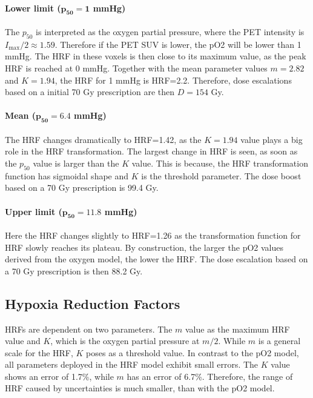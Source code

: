 \paragraph{Lower limit ($\mathbf{p_{50}=1}$ mmHg)}The $p_{50}$ is interpreted as the oxygen partial pressure, where the PET intensity is $I_\mathrm{max}/2\approx 1.59$. Therefore if the PET SUV is lower, the pO2 will be lower than 1 mmHg. The HRF in these voxels is then close to its maximum value, as the peak HRF is reached at 0 mmHg. Together with the mean parameter values $m=2.82$ and $K=1.94$, the HRF for 1 mmHg is HRF=2.2. Therefore, dose escalations based on a initial 70 Gy prescription are then $D=154$ Gy.
\paragraph{Mean ($\mathbf{p_{50}=6.4}$ mmHg)}The HRF changes dramatically to HRF=1.42, as the $K=1.94$ value plays a big role in the HRF transformation. The largest change in HRF is seen, as soon as the $p_{50}$ value is larger than the $K$ value. This is because, the HRF transformation function has sigmoidal shape and $K$ is the threshold parameter. The dose boost based on a 70 Gy prescription is 99.4 Gy.
\paragraph{Upper limit ($\mathbf{p_{50}=11.8}$ mmHg)}Here the HRF changes slightly to HRF=1.26 as the transformation function for HRF slowly reaches its plateau. By construction, the larger the pO2 values derived from the oxygen model, the lower the HRF. The dose escalation based on a 70 Gy prescription is then 88.2 Gy.
\subsection{Hypoxia Reduction Factors}
HRFs are dependent on two parameters. The $m$ value as the maximum HRF value and $K$, which is the oxygen partial pressure at $m/2$. While $m$ is a general scale for the HRF, $K$ poses as a threshold value. In contrast to the pO2 model, all parameters deployed in the HRF model exhibit small errors. The $K$ value shows an error of 1.7\%, while $m$ has an error of 6.7\%. Therefore, the range of HRF caused by uncertainties is much smaller, than with the pO2 model.
